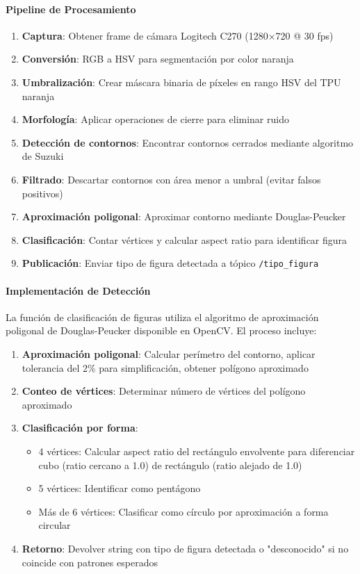\paragraph{Pipeline de Procesamiento}

\begin{enumerate}
    \item \textbf{Captura}: Obtener frame de cámara Logitech C270 (1280×720 @ 30 fps)
    \item \textbf{Conversión}: RGB a HSV para segmentación por color naranja
    \item \textbf{Umbralización}: Crear máscara binaria de píxeles en rango HSV del TPU naranja
    \item \textbf{Morfología}: Aplicar operaciones de cierre para eliminar ruido
    \item \textbf{Detección de contornos}: Encontrar contornos cerrados mediante algoritmo de Suzuki
    \item \textbf{Filtrado}: Descartar contornos con área menor a umbral (evitar falsos positivos)
    \item \textbf{Aproximación poligonal}: Aproximar contorno mediante Douglas-Peucker
    \item \textbf{Clasificación}: Contar vértices y calcular aspect ratio para identificar figura
    \item \textbf{Publicación}: Enviar tipo de figura detectada a tópico \texttt{/tipo\_figura}
\end{enumerate}

\paragraph{Implementación de Detección}

La función de clasificación de figuras utiliza el algoritmo de aproximación poligonal de Douglas-Peucker disponible en OpenCV. El proceso incluye:

\begin{enumerate}
    \item \textbf{Aproximación poligonal}: Calcular perímetro del contorno, aplicar tolerancia del 2\% para simplificación, obtener polígono aproximado
    \item \textbf{Conteo de vértices}: Determinar número de vértices del polígono aproximado
    \item \textbf{Clasificación por forma}:
    \begin{itemize}
        \item 4 vértices: Calcular aspect ratio del rectángulo envolvente para diferenciar cubo (ratio cercano a 1.0) de rectángulo (ratio alejado de 1.0)
        \item 5 vértices: Identificar como pentágono
        \item Más de 6 vértices: Clasificar como círculo por aproximación a forma circular
    \end{itemize}
    \item \textbf{Retorno}: Devolver string con tipo de figura detectada o "desconocido" si no coincide con patrones esperados
\end{enumerate}

